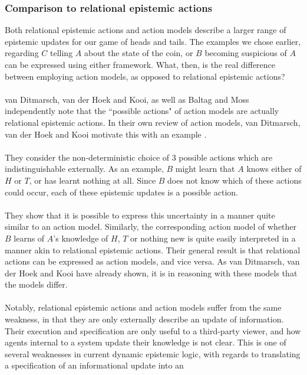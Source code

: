 \documentclass[12pt, a4paper, titlepage]{scrartcl}
\begin{document}
\subsubsection{Comparison to relational epistemic actions} \label{epi_compare}
Both relational epistemic actions \cite{hoek2008dynamic} and action models
\cite{baltag1998lpa} describe a larger range of epistemic updates for our game of heads and tails.
The examples we chose earlier, regarding $C$ telling $A$ about the state of the
coin, or $B$ becoming suspicious of $A$ can be expressed using either framework.
What, then, is the real difference between employing action models, as opposed
to relational epistemic actions?\\
\\
van Ditmarsch, van der Hoek and Kooi, as well as Baltag and Moss independently
note that the ``possible actions" of action models  are actually relational
epistemic actions.
In their own review of action models, van Ditmarsch, van der Hoek and Kooi
motivate this with an example \cite{hoek2008dynamic,baltag2005programs}.\\
\\
They consider the non-deterministic choice of 3 possible actions which are
indistinguishable externally.
As an example, $B$ might learn that $A$ knows either of $H$ or $T$, or has
learnt nothing at all.
Since $B$ does not know which of these actions could occur, each of these
epistemic updates is a possible action.\\
\\
They show that it is possible to express this uncertainty in a manner quite similar
to an action model.
Similarly, the corresponding action model of whether $B$ learns of $A$'s
knowledge of $H$, $T$ or nothing new is quite easily interpreted in a manner
akin to relational epistemic actions.
Their general result is that relational actions can be expressed as action
models, and vice versa.
As van Ditmarsch, van der Hoek and Kooi have already shown, it is in reasoning
with these models that the models differ.\\
\\
Notably, relational epistemic actions and action models suffer from the same
weakness, in that they are only externally describe an update of information.
Their execution and specification are only useful to a third-party viewer, and
how agents internal to a system update their knowledge is not clear.
This is one of several weaknesses in current dynamic epistemic logic, with
regards to translating a specification of an informational update into an
\end{document}
